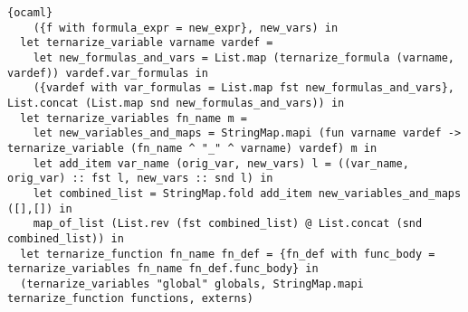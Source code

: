 \begin{lstlisting}{ocaml}
    ({f with formula_expr = new_expr}, new_vars) in
  let ternarize_variable varname vardef =
    let new_formulas_and_vars = List.map (ternarize_formula (varname, vardef)) vardef.var_formulas in
    ({vardef with var_formulas = List.map fst new_formulas_and_vars}, List.concat (List.map snd new_formulas_and_vars)) in
  let ternarize_variables fn_name m =
    let new_variables_and_maps = StringMap.mapi (fun varname vardef -> ternarize_variable (fn_name ^ "_" ^ varname) vardef) m in
    let add_item var_name (orig_var, new_vars) l = ((var_name, orig_var) :: fst l, new_vars :: snd l) in
    let combined_list = StringMap.fold add_item new_variables_and_maps ([],[]) in
    map_of_list (List.rev (fst combined_list) @ List.concat (snd combined_list)) in
  let ternarize_function fn_name fn_def = {fn_def with func_body = ternarize_variables fn_name fn_def.func_body} in
  (ternarize_variables "global" globals, StringMap.mapi ternarize_function functions, externs)


\end{lstlisting}
